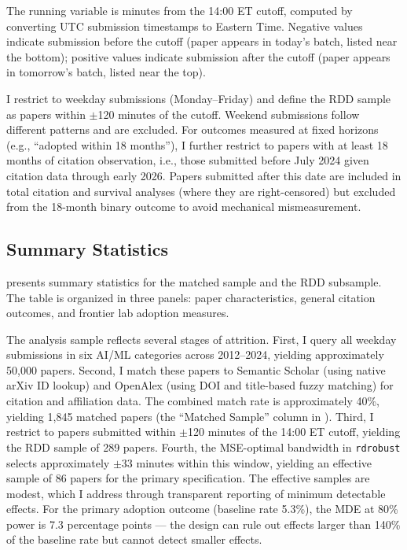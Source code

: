 \documentclass[12pt]{article}
\begin{document}
The running variable is minutes from the 14:00 ET cutoff, computed by converting UTC submission timestamps to Eastern Time. Negative values indicate submission before the cutoff (paper appears in today's batch, listed near the bottom); positive values indicate submission after the cutoff (paper appears in tomorrow's batch, listed near the top).

I restrict to weekday submissions (Monday--Friday) and define the RDD sample as papers within $\pm$120 minutes of the cutoff. Weekend submissions follow different patterns and are excluded. For outcomes measured at fixed horizons (e.g., ``adopted within 18 months''), I further restrict to papers with at least 18 months of citation observation, i.e., those submitted before July 2024 given citation data through early 2026. Papers submitted after this date are included in total citation and survival analyses (where they are right-censored) but excluded from the 18-month binary outcome to avoid mechanical mismeasurement.

\subsection{Summary Statistics}

 presents summary statistics for the matched sample and the RDD subsample. The table is organized in three panels: paper characteristics, general citation outcomes, and frontier lab adoption measures.


  


The analysis sample reflects several stages of attrition. First, I query all weekday submissions in six AI/ML categories across 2012--2024, yielding approximately 50,000 papers. Second, I match these papers to Semantic Scholar (using native arXiv ID lookup) and OpenAlex (using DOI and title-based fuzzy matching) for citation and affiliation data. The combined match rate is approximately 40\%, yielding 1,845 matched papers (the ``Matched Sample'' column in ). Third, I restrict to papers submitted within $\pm$120 minutes of the 14:00 ET cutoff, yielding the RDD sample of 289 papers. Fourth, the MSE-optimal bandwidth in \texttt{rdrobust} selects approximately $\pm$33 minutes within this window, yielding an effective sample of 86 papers for the primary specification. The effective samples are modest, which I address through transparent reporting of minimum detectable effects. For the primary adoption outcome (baseline rate 5.3\%), the MDE at 80\% power is 7.3 percentage points --- the design can rule out effects larger than 140\% of the baseline rate but cannot detect smaller effects.
\end{document}
